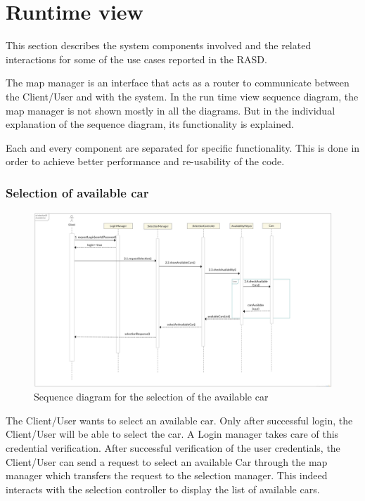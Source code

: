 \section{Runtime view}
This section describes the system components involved and the related interactions for some of the use cases reported in the RASD.

The map manager is an interface that acts as a router to communicate between the Client/User and with the system. In the run time view sequence diagram,
the map manager is not shown mostly in all the diagrams. But in the individual explanation of the sequence diagram, its functionality is explained.

Each and every component are separated for specific functionality. This is done in order to achieve better performance and re-usability of the code.

\subsubsection{Selection of available car}
\begin{figure}[t]
	\centering
	\includegraphics[width=\linewidth,keepaspectratio]{figures/selection_available_car_runtime.eps}
	\caption{Sequence diagram for the selection of the available car}
	\label{fig:selection_available_car_runtime}
\end{figure}

The Client/User wants to select an available car. Only after successful login, the Client/User will be able to select the car. A Login manager takes care of this credential verification.
After successful verification of the user credentials, the Client/User can send a request to select an available Car through the map manager which transfers the request to the selection
manager. This indeed interacts with the selection controller to display the list of available cars.

